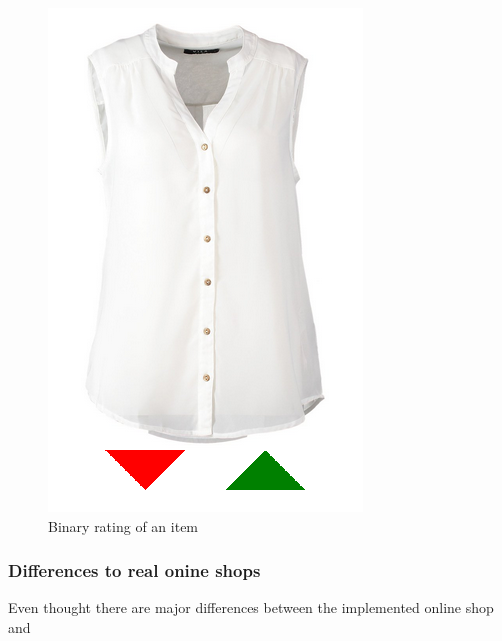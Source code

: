 \begin{figure}[h]
    \center
    \includegraphics[scale=0.3]{inc/implementation/onlineshop/recommender-onlineshop-binary_rating}
    \caption{Binary rating of an item}
    \label{fig:onlineshop-explicit-rating}
\end{figure}


\subsubsection{Differences to real onine shops}
Even thought there are major differences between the implemented online shop and

